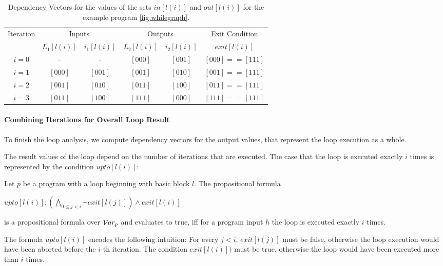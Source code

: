 \begin{table}
    \centering
    \begin{tabular}{|c|c|c|c|c|c|}
    Iteration & \multicolumn{2}{|c|}{Inputs} & \multicolumn{2}{|c|}{Outputs} & Exit Condition \\
     & $L_1[l(i)]$ & $i_1[l(i)]$ & $L_2[l(i)]$ & $i_2[l(i)]$ & $exit[l(i)]$ \\
     \hline
     $i = 0$ & - & - & $[0 0 0]$ & $[0 0 1]$ & $[000] == [111]$ \\
     $i = 1$ & $[0 0 0]$ & $[0 0 1]$ & $[0 0 1]$ & $[0 1 0]$ & $[001] == [111]$ \\
     $i = 2$ & $[0 0 1]$ & $[0 1 0]$ & $[0 1 1]$ & $[1 0 0]$ & $[011] == [111]$ \\
     $i = 3$ & $[0 1 1]$ & $[1 0 0]$ & $[1 1 1]$ & $[0 0 0]$ & $[111] == [111]$ \\
    \end{tabular}
    \caption{Dependency Vectors for the values of the sets $in[l(i)]$ and $out[l(i)]$ for the example program \ref{fig:whilegraph}.}
    \label{tab:loop}
\end{table}

\paragraph{Combining Iterations for Overall Loop Result}
To finish the loop analysis, we compute dependency vectors for the output values, that represent the loop execution as a whole.

The result values of the loop depend on the number of iterations that are executed. The case that the loop is executed exactly $i$ times is represented by the condition $upto[l(i)]$:

\begin{definition}
    Let $p$ be a program with a loop beginning with basic block $l$.
    The propositional formula
    \begin{center}
        $upto[l(i)]: (\bigwedge\limits_{0 \leq j < i} \lnot exit[l(j)]) \land exit[l(i)]$
    \end{center}
    is a propositional formula over $\mathcal{V}ar_p$ and evaluates to true, iff for a program input $h$ the loop is executed exactly $i$ times.
\end{definition}

The formula $upto[l(i)]$ encodes the following intuition: For every $j < i$, $exit[l(j)]$ must be false, otherwise the loop execution would have been aborted before the $i$-th iteration. The condition $exit[l(i)])$ must be true, otherwise the loop would have been executed more than $i$ times.

